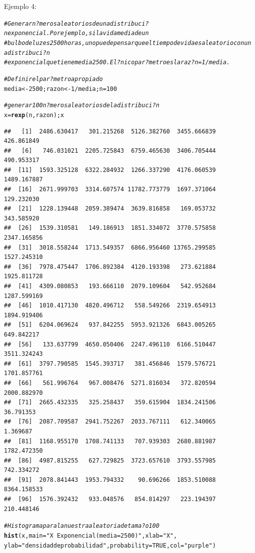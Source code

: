 \documentclass[10pt,a4paper]{article}\usepackage[]{graphicx}\usepackage[]{color}
\makeatletter
\newcommand{\hlnum}[1]{\textcolor[rgb]{0.686,0.059,0.569}{#1}}%
\newcommand{\hlstr}[1]{\textcolor[rgb]{0.192,0.494,0.8}{#1}}%
\newcommand{\hlcom}[1]{\textcolor[rgb]{0.678,0.584,0.686}{\textit{#1}}}%
\newcommand{\hlopt}[1]{\textcolor[rgb]{0,0,0}{#1}}%
\newcommand{\hlstd}[1]{\textcolor[rgb]{0.345,0.345,0.345}{#1}}%
\newcommand{\hlkwb}[1]{\textcolor[rgb]{0.69,0.353,0.396}{#1}}%
\newcommand{\hlkwc}[1]{\textcolor[rgb]{0.333,0.667,0.333}{#1}}%
\newcommand{\hlkwd}[1]{\textcolor[rgb]{0.737,0.353,0.396}{\textbf{#1}}}%
\newenvironment{kframe}{%
 \def\at@end@of@kframe{}%
 \ifinner\ifhmode%
  \def\at@end@of@kframe{\end{minipage}}%
  \begin{minipage}{\columnwidth}%
 \fi\fi%
 \def\FrameCommand##1{\hskip\@totalleftmargin \hskip-\fboxsep
 \colorbox{shadecolor}{##1}\hskip-\fboxsep
     \hskip-\linewidth \hskip-\@totalleftmargin \hskip\columnwidth}%
 \MakeFramed {\advance\hsize-\width
   \@totalleftmargin\z@ \linewidth\hsize
   \@setminipage}}%
 {\par\unskip\endMakeFramed%
 \at@end@of@kframe}
\newenvironment{knitrout}{}{} %
\makeatother
\begin{document}
Ejemplo 4: 
\begin{knitrout}
\color{fgcolor}\begin{kframe}
\begin{alltt}
\hlcom{#Generar n?meros aleatorios de una distribuci?n exponencial. Por ejemplo, si la vida media de un }
\hlcom{#bulbo de luz es 2500 horas, uno puede pensar que el tiempo de vida es aleatorio con una distribuci?n }
\hlcom{#exponencial que tiene media 2500. El ?nico par?metro es la raz?n = 1/media.}

\hlcom{# Definir el par?metro apropiado }
\hlstd{media} \hlkwb{<-} \hlnum{2500}\hlstd{; razon} \hlkwb{<-} \hlnum{1}\hlopt{/}\hlstd{media;n}\hlkwb{=}\hlnum{100}

\hlcom{# generar 100 n?meros aleatorios de la distribuci?n }
\hlstd{x} \hlkwb{=} \hlkwd{rexp}\hlstd{(n, razon); x}
\end{alltt}
\begin{verbatim}
##   [1]  2486.630417   301.215268  5126.382760  3455.666839   426.861849
##   [6]   746.031021  2205.725843  6759.465630  3406.705444   490.953317
##  [11]  1593.325128  6322.284932  1266.337290  4176.060539  1489.167887
##  [16]  2671.999703  3314.607574 11782.773779  1697.371064   129.232030
##  [21]  1228.139448  2059.389474  3639.816858   169.053732   343.585920
##  [26]  1539.310581   149.186913  1851.334072  3770.575858  2347.165856
##  [31]  3018.558244  1713.549357  6866.956460 13765.299585  1527.245310
##  [36]  7978.475447  1706.892384  4120.193398   273.621884  1925.811728
##  [41]  4309.080853   193.666110  2079.109604   542.952684  1287.599169
##  [46]  1010.417130  4820.496712   558.549266  2319.654913  1894.919406
##  [51]  6204.069624   937.842255  5953.921326  6843.005265   649.842217
##  [56]   133.637799  4650.050406  2247.496110  6166.510447  3511.324243
##  [61]  3797.790585  1545.393717   381.456846  1579.576721  1701.857761
##  [66]   561.996764   967.008476  5271.816034   372.820594  2000.882970
##  [71]  2665.432335   325.258437   359.615904  1834.241506    36.791353
##  [76]  2087.709587  2941.752267  2033.767111   612.340065     1.369687
##  [81]  1168.955170  1708.741133   707.939303  2680.881987  1782.472350
##  [86]  4987.815255   627.729825  3723.657610  3793.557985   742.334272
##  [91]  2078.841443  1953.794332    90.696266  1853.510088  8364.158533
##  [96]  1576.392432   933.048576   854.814297   223.194397   210.448146
\end{verbatim}
\begin{alltt}
\hlcom{# Histograma para la nuestra aleatoria de tama?o 100 }
\hlkwd{hist}\hlstd{(x,} \hlkwc{main}\hlstd{=}\hlstr{"X ~ Exponencial( media = 2500 )"}\hlstd{,} \hlkwc{xlab}\hlstd{=}\hlstr{"X"}\hlstd{,}
\hlkwc{ylab}\hlstd{=}\hlstr{"densidad de probabilidad"}\hlstd{,} \hlkwc{probability}\hlstd{=}\hlnum{TRUE}\hlstd{,} \hlkwc{col}\hlstd{=}\hlstr{"purple"}\hlstd{)}


\end{alltt}
\end{kframe}
\end{knitrout}
\end{document}
